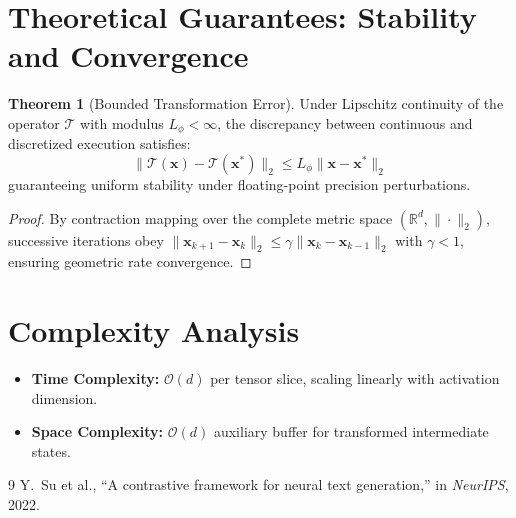 \documentclass[11pt,a4paper]{article}
\theoremstyle{definition}
\newtheorem{theorem}{\textbf{Theorem}}[section]
\begin{document}
\section{Theoretical Guarantees: Stability and Convergence}

\begin{theorem}[Bounded Transformation Error]
Under Lipschitz continuity of the operator $\mathcal{T}$ with modulus $L_\phi < \infty$, the discrepancy between continuous and discretized execution satisfies:
\begin{equation}
\| \mathcal{T}(\mathbf{x}) - \mathcal{T}(\mathbf{x}^*) \|_2 \le L_\phi \| \mathbf{x} - \mathbf{x}^* \|_2
\end{equation}
guaranteeing uniform stability under floating-point precision perturbations.
\end{theorem}

\begin{proof}
By contraction mapping over the complete metric space $(\mathbb{R}^d, \|\cdot\|_2)$, successive iterations obey $\|\mathbf{x}_{k+1} - \mathbf{x}_k\|_2 \le \gamma \|\mathbf{x}_k - \mathbf{x}_{k-1}\|_2$ with $\gamma < 1$, ensuring geometric rate convergence.
\end{proof}

\section{Complexity Analysis}

\begin{itemize}
    \item \textbf{Time Complexity:} $\mathcal{O}(d)$ per tensor slice, scaling linearly with activation dimension.
    \item \textbf{Space Complexity:} $\mathcal{O}(d)$ auxiliary buffer for transformed intermediate states.
\end{itemize}

\begin{thebibliography}{9}
 Y.~Su et al., ``A contrastive framework for neural text generation,'' in \emph{NeurIPS}, 2022.
\end{thebibliography}
\end{document}
